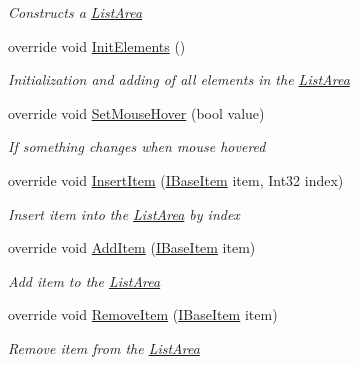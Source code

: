 \begin{DoxyCompactItemize}
\begin{DoxyCompactList}\small\item\em Constructs a \mbox{\hyperlink{class_space_v_i_l_1_1_list_area}{List\+Area}} \end{DoxyCompactList}\item 
override void \mbox{\hyperlink{class_space_v_i_l_1_1_list_area_ac60446e61da68f5a73ef6981ac26c9a3}{Init\+Elements}} ()
\begin{DoxyCompactList}\small\item\em Initialization and adding of all elements in the \mbox{\hyperlink{class_space_v_i_l_1_1_list_area}{List\+Area}} \end{DoxyCompactList}\item 
override void \mbox{\hyperlink{class_space_v_i_l_1_1_list_area_a14f2764a6ad13641bf4761f37a5ec2ae}{Set\+Mouse\+Hover}} (bool value)
\begin{DoxyCompactList}\small\item\em If something changes when mouse hovered \end{DoxyCompactList}\item 
override void \mbox{\hyperlink{class_space_v_i_l_1_1_list_area_a44efda800a4a280b7a452bd09c90f484}{Insert\+Item}} (\mbox{\hyperlink{interface_space_v_i_l_1_1_core_1_1_i_base_item}{I\+Base\+Item}} item, Int32 index)
\begin{DoxyCompactList}\small\item\em Insert item into the \mbox{\hyperlink{class_space_v_i_l_1_1_list_area}{List\+Area}} by index \end{DoxyCompactList}\item 
override void \mbox{\hyperlink{class_space_v_i_l_1_1_list_area_a31bfa40ca257cb8d2709f1b0b15fea71}{Add\+Item}} (\mbox{\hyperlink{interface_space_v_i_l_1_1_core_1_1_i_base_item}{I\+Base\+Item}} item)
\begin{DoxyCompactList}\small\item\em Add item to the \mbox{\hyperlink{class_space_v_i_l_1_1_list_area}{List\+Area}} \end{DoxyCompactList}\item 
override void \mbox{\hyperlink{class_space_v_i_l_1_1_list_area_a0020756686088a62a43388973fa2d7bf}{Remove\+Item}} (\mbox{\hyperlink{interface_space_v_i_l_1_1_core_1_1_i_base_item}{I\+Base\+Item}} item)
\begin{DoxyCompactList}\small\item\em Remove item from the \mbox{\hyperlink{class_space_v_i_l_1_1_list_area}{List\+Area}} \end{DoxyCompactList}\item 

\end{DoxyCompactItemize}
